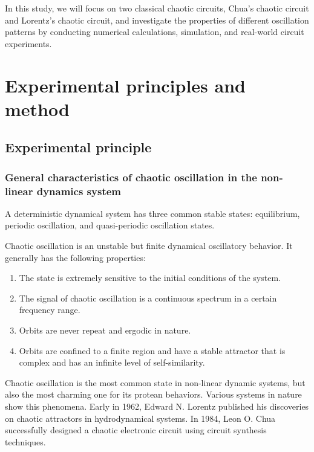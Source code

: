 \documentclass[10pt,a4paper,twocolumn,twoside,UTF8]{article}
\begin{document}
In this study, we will focus on two classical chaotic circuits, Chua's chaotic circuit and Lorentz's chaotic circuit,
and investigate the properties of different oscillation patterns by conducting numerical calculations, simulation, and real-world circuit experiments.

\section{Experimental principles and method}
	\subsection{Experimental principle}
		\subsubsection{General characteristics of chaotic oscillation in the non-linear dynamics system\autocite{shenGeneralPhysicsLaboratory2015}}
		
		A deterministic dynamical system has three common stable states: equilibrium, periodic oscillation, and quasi-periodic oscillation states.
		
		Chaotic oscillation is an unstable but finite dynamical oscillatory behavior. It generally has the following properties:
		
		\begin{enumerate}[label=\arabic*.]
			\item The state is extremely sensitive to the initial conditions of the system.
  			\item The signal of chaotic oscillation is a continuous spectrum in a certain frequency range.
     		\item Orbits are never repeat and ergodic in nature.
       		\item Orbits are confined to a finite region and have a stable attractor that is complex and has an infinite level of self-similarity.
		\end{enumerate}
		
		Chaotic oscillation is the most common state in non-linear dynamic systems, but also the most charming one for its protean behaviors. 
		Various systems in nature show this phenomena. 
		Early in 1962, Edward N. Lorentz published his discoveries on chaotic attractors in hydrodynamical systems. 
		In 1984, Leon O. Chua successfully designed a chaotic electronic circuit using circuit synthesis techniques. 
		
\end{document}
